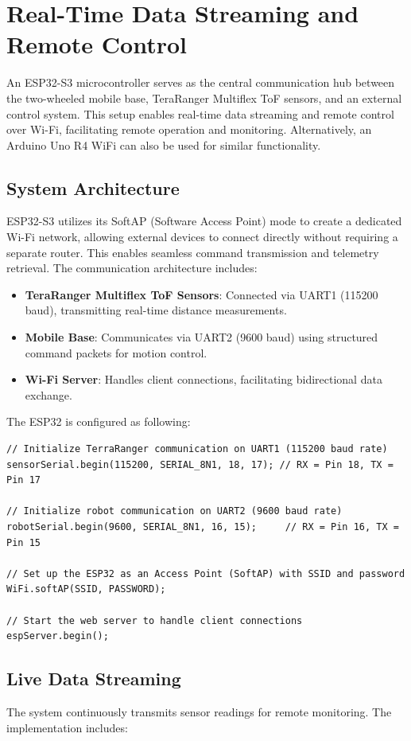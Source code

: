 
\section{Real-Time Data Streaming and Remote Control}
An ESP32-S3 microcontroller serves as the central communication hub between the two-wheeled mobile base, TeraRanger Multiflex ToF sensors, and an external control system. This setup enables real-time data streaming and remote control over Wi-Fi, facilitating remote operation and monitoring. Alternatively, an Arduino Uno R4 WiFi can also be used for similar functionality.

\subsection{System Architecture}  
ESP32-S3 utilizes its SoftAP (Software Access Point) mode to create a dedicated Wi-Fi network, allowing external devices to connect directly without requiring a separate router.
This enables seamless command transmission and telemetry retrieval. The communication architecture includes:

\begin{itemize}
	\item \textbf{TeraRanger Multiflex ToF Sensors}: Connected via UART1 (115200 baud), transmitting real-time distance measurements.
	\item \textbf{Mobile Base}: Communicates via UART2 (9600 baud) using structured command packets for motion control.
	\item \textbf{Wi-Fi Server}: Handles client connections, facilitating bidirectional data exchange. 
\end{itemize}

The ESP32 is configured as following:
\begin{lstlisting}[style=cppstyle2]
// Initialize TerraRanger communication on UART1 (115200 baud rate)
sensorSerial.begin(115200, SERIAL_8N1, 18, 17); // RX = Pin 18, TX = Pin 17
	
// Initialize robot communication on UART2 (9600 baud rate)
robotSerial.begin(9600, SERIAL_8N1, 16, 15);     // RX = Pin 16, TX = Pin 15

// Set up the ESP32 as an Access Point (SoftAP) with SSID and password
WiFi.softAP(SSID, PASSWORD);

// Start the web server to handle client connections
espServer.begin();
\end{lstlisting}


\subsection{Live Data Streaming}
 The system continuously transmits sensor readings for remote monitoring. The implementation includes:

